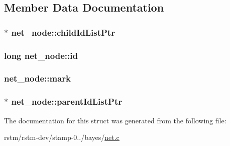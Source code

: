 \subsection{Member Data Documentation}
\hypertarget{structnet__node_a54685066f29ca15c6e288de170f957f4}{
\subsubsection[{child\-Id\-List\-Ptr}]{$\ast$ net\-\_\-node\-::child\-Id\-List\-Ptr}}\label{structnet__node_a54685066f29ca15c6e288de170f957f4}
\hypertarget{structnet__node_a1758c89af48cd62a67799a307edf5e0f}{
\subsubsection[{id}]{\setlength{\rightskip}{0pt plus 5cm}long net\-\_\-node\-::id}}\label{structnet__node_a1758c89af48cd62a67799a307edf5e0f}
\hypertarget{structnet__node_a84c53619eb4b1743c18526adef84c12e}{
\subsubsection[{mark}]{ net\-\_\-node\-::mark}}\label{structnet__node_a84c53619eb4b1743c18526adef84c12e}
\hypertarget{structnet__node_afa5ef448247c7724b922fec5dfb99f26}{
\subsubsection[{parent\-Id\-List\-Ptr}]{$\ast$ net\-\_\-node\-::parent\-Id\-List\-Ptr}}\label{structnet__node_afa5ef448247c7724b922fec5dfb99f26}


The documentation for this struct was generated from the following file\-:\begin{DoxyCompactItemize}
\item 
rstm/rstm-\/dev/stamp-\/0../bayes/\hyperlink{net_8c}{net.\-c}\end{DoxyCompactItemize}
